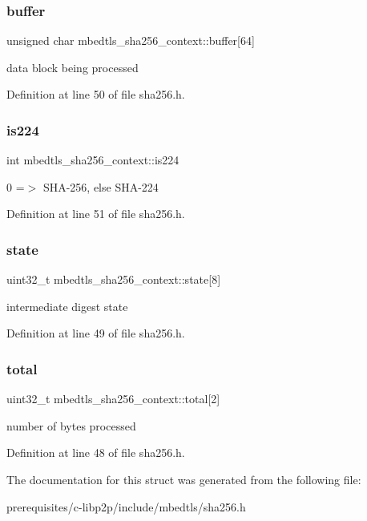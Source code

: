 \subsubsection{\texorpdfstring{buffer}{buffer}}
{\footnotesize\ttfamily unsigned char mbedtls\+\_\+sha256\+\_\+context\+::buffer\mbox{[}64\mbox{]}}

data block being processed 

Definition at line 50 of file sha256.\+h.

\mbox{\label{structmbedtls__sha256__context_ac73158ffb252c4bd2ccb991653619cc1}} 
\subsubsection{\texorpdfstring{is224}{is224}}
{\footnotesize\ttfamily int mbedtls\+\_\+sha256\+\_\+context\+::is224}

0 =$>$ S\+H\+A-\/256, else S\+H\+A-\/224 

Definition at line 51 of file sha256.\+h.

\mbox{\label{structmbedtls__sha256__context_a88df25a0934134bd8b686152ba763322}} 
\subsubsection{\texorpdfstring{state}{state}}
{\footnotesize\ttfamily uint32\+\_\+t mbedtls\+\_\+sha256\+\_\+context\+::state\mbox{[}8\mbox{]}}

intermediate digest state 

Definition at line 49 of file sha256.\+h.

\mbox{\label{structmbedtls__sha256__context_ab7444610a95153450180924862b2a0fa}} 
\subsubsection{\texorpdfstring{total}{total}}
{\footnotesize\ttfamily uint32\+\_\+t mbedtls\+\_\+sha256\+\_\+context\+::total\mbox{[}2\mbox{]}}

number of bytes processed 

Definition at line 48 of file sha256.\+h.



The documentation for this struct was generated from the following file\+:\begin{DoxyCompactItemize}
\item 
prerequisites/c-\/libp2p/include/mbedtls/sha256.\+h\end{DoxyCompactItemize}
